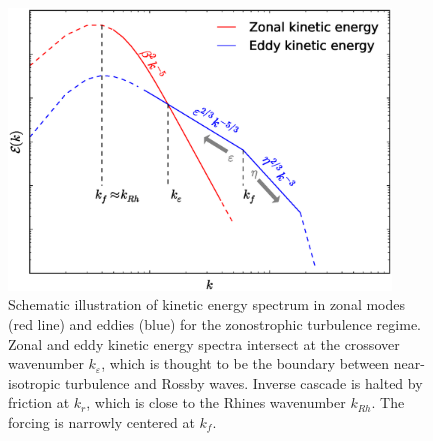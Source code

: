 \documentclass{ametsoc}
\begin{document}
\begin{figure}
\begin{center}
\includegraphics[width=4in]{EKE_ZKE_spectra_illustrate}\caption{Schematic illustration of kinetic energy spectrum in zonal modes (red
line) and eddies (blue) for the zonostrophic turbulence regime. Zonal
and eddy kinetic energy spectra intersect at the crossover wavenumber $k_{\varepsilon}$,
which is thought to be the boundary between near-isotropic turbulence and Rossby
waves. Inverse cascade is halted by friction at $k_{r}$, which is
close to the Rhines wavenumber $k_{Rh}$. The forcing is narrowly
centered at $k_{f}$.}
\label{EKE_KE_spectra_illustrate}
\end{center}
\end{figure}
\end{document}

